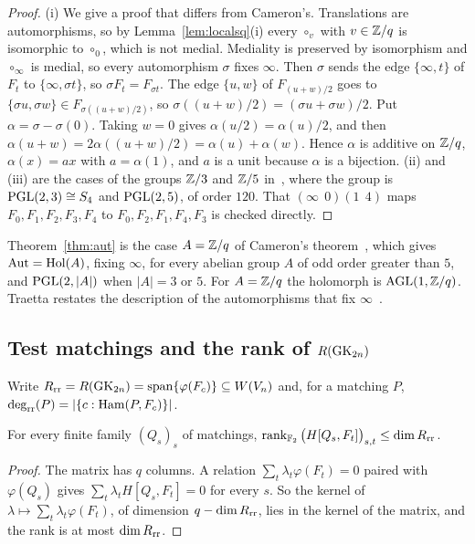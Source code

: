 \begin{proof}
(i) We give a proof that differs from Cameron's. Translations are automorphisms, so by Lemma~\ref{lem:localsq}(i) every $\circ_v$ with $v\in\mathbb{Z}/q$ is isomorphic to $\circ_0$, which is not medial. Mediality is preserved by isomorphism and $\circ_\infty$ is medial, so every automorphism $\sigma$ fixes $\infty$. Then $\sigma$ sends the edge $\{\infty,t\}$ of $F_t$ to $\{\infty,\sigma t\}$, so $\sigma F_t=F_{\sigma t}$. The edge $\{u,w\}$ of $F_{(u+w)/2}$ goes to $\{\sigma u,\sigma w\}\in F_{\sigma((u+w)/2)}$, so $\sigma((u+w)/2)=(\sigma u+\sigma w)/2$. Put $\alpha=\sigma-\sigma(0)$. Taking $w=0$ gives $\alpha(u/2)=\alpha(u)/2$, and then $\alpha(u+w)=2\alpha((u+w)/2)=\alpha(u)+\alpha(w)$. Hence $\alpha$ is additive on $\mathbb{Z}/q$, $\alpha(x)=ax$ with $a=\alpha(1)$, and $a$ is a unit because $\alpha$ is a bijection. (ii) and (iii) are the cases of the groups $\mathbb{Z}/3$ and $\mathbb{Z}/5$ in~\cite[Thm.~2.2]{Cameron75}, where the group is $\operatorname{PGL}(2,3)\cong S_4$ and $\operatorname{PGL}(2,5)$, of order $120$. That $(\infty\;\,0)(1\;\,4)$ maps $F_0,F_1,F_2,F_3,F_4$ to $F_0,F_2,F_1,F_4,F_3$ is checked directly.
\end{proof}

Theorem~\ref{thm:aut} is the case $A=\mathbb{Z}/q$ of Cameron's theorem~\cite[Thm.~2.2]{Cameron75}, which gives $\operatorname{Aut}=\mathrm{Hol}(A)$, fixing $\infty$, for every abelian group $A$ of odd order greater than $5$, and $\operatorname{PGL}(2,|A|)$ when $|A|=3$ or $5$. For $A=\mathbb{Z}/q$ the holomorph is $\operatorname{AGL}(1,\mathbb{Z}/q)$. Traetta restates the description of the automorphisms that fix $\infty$~\cite[Prop.~4]{Traetta13}.

\subsection{Test matchings and the rank of \texorpdfstring{$R(\mathrm{GK}_{2n})$}{R(GK\_2n)}}

Write $R_{\mathrm{rr}}=R(\mathrm{GK}_{2n})=\operatorname{span}\{\varphi(F_c)\}\subseteq W(V_n)$ and, for a matching $P$, $\deg_{\mathrm{rr}}(P)=\lvert\{c:\operatorname{Ham}(P,F_c)\}\rvert$.

\begin{lemma}\label{lem:pairing}
For every finite family ${(Q_s)}_s$ of matchings, $\operatorname{rank}_{\mathbb{F}_2}{\bigl(H[Q_s,F_t]\bigr)}_{s,t}\le\dim R_{\mathrm{rr}}$.
\end{lemma}

\begin{proof}
The matrix has $q$ columns. A relation $\sum_t\lambda_t\varphi(F_t)=0$ paired with $\varphi(Q_s)$ gives $\sum_t\lambda_{t}H[Q_s,F_t]=0$ for every $s$. So the kernel of $\lambda\mapsto\sum_t\lambda_t\varphi(F_t)$, of dimension $q-\dim R_{\mathrm{rr}}$, lies in the kernel of the matrix, and the rank is at most $\dim R_{\mathrm{rr}}$.
\end{proof}

